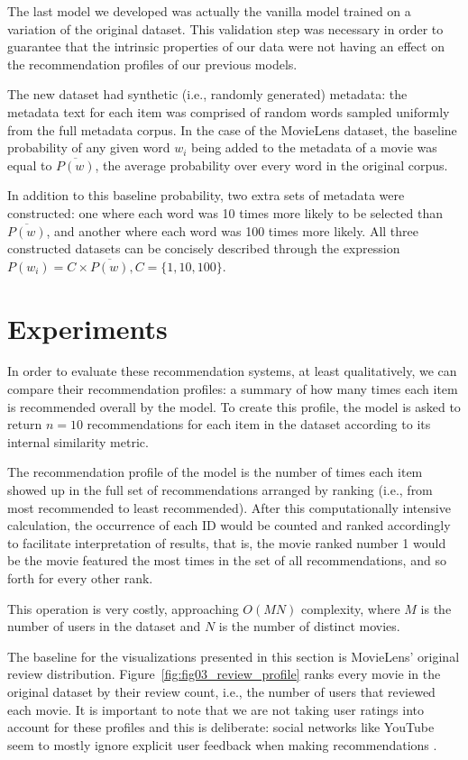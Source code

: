 The last model we developed was actually the vanilla model trained on a
variation of the original dataset. This validation step was necessary in order
to guarantee that the intrinsic properties of our data were not having an effect
on the recommendation profiles of our previous models.

The new dataset had synthetic (i.e., randomly generated) metadata: the metadata
text for each item was comprised of random words sampled uniformly from the full
metadata corpus. In the case of the MovieLens dataset, the baseline probability
of any given word $w_i$ being added to the metadata of a movie was equal to
$\overline{P(w)}$, the average probability over every word in the original
corpus.

In addition to this baseline probability, two extra sets of metadata were
constructed: one where each word was 10 times more likely to be selected than
$\overline{P(w)}$, and another where each word was 100 times more likely. All
three constructed datasets can be concisely described through the expression
$P(w_i) = C \times \overline{P(w)}, C = \{1, 10, 100\}$.

\section{Experiments}
\label{sec:experiments}

In order to evaluate these recommendation systems, at least qualitatively, we
can compare their recommendation profiles: a summary of how many times each item
is recommended overall by the model. To create this profile, the model is asked
to return $n = 10$ recommendations for each item in the dataset according to its
internal similarity metric.

The recommendation profile of the model is the number of times each item showed
up in the full set of recommendations arranged by ranking (i.e., from most
recommended to least recommended). After this computationally intensive
calculation, the occurrence of each ID would be counted and ranked accordingly
to facilitate interpretation of results, that is, the movie ranked number 1
would be the movie featured the most times in the set of all recommendations,
and so forth for every other rank.

This operation is very costly, approaching $O(MN)$ complexity, where $M$ is the
number of users in the dataset and $N$ is the number of distinct movies.

The baseline for the visualizations presented in this section is MovieLens'
original review distribution. Figure~\ref{fig:fig03_review_profile} ranks every
movie in the original dataset by their review count, i.e., the number of users
that reviewed each movie. It is important to note that we are not taking user
ratings into account for these profiles and this is deliberate: social networks
like YouTube seem to mostly ignore explicit user feedback when making
recommendations \citep{noauthor_mozilla_nodate}.

